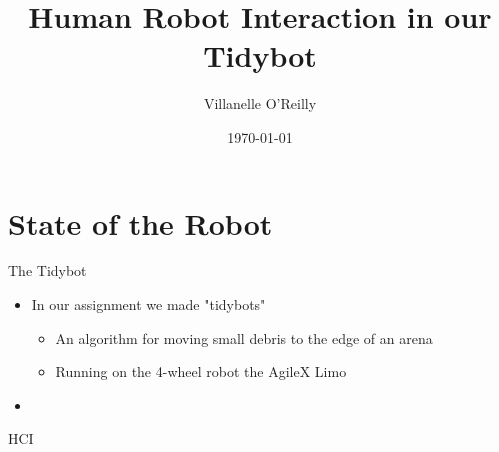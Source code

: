 \documentclass[aspectratio=169]{beamer}
\title{Human Robot Interaction in our Tidybot}
\author{Villanelle O'Reilly}
\date{\today}
\begin{document}
    \begin{frame}
        \titlepage 
    \end{frame}

    \section{State of the Robot}
    
        \begin{frame}{The Tidybot}
            
            \begin{itemize}
                \item In our assignment we made "tidybots"
                \begin{itemize}
                    \item An algorithm for moving small debris to the edge of an arena
                    \item Running on the 4-wheel robot the AgileX Limo
                \end{itemize}
                \item 
            \end{itemize}
            
        \end{frame}

        \begin{frame}{HCI}
            
        \end{frame}
    
    
\end{document}
